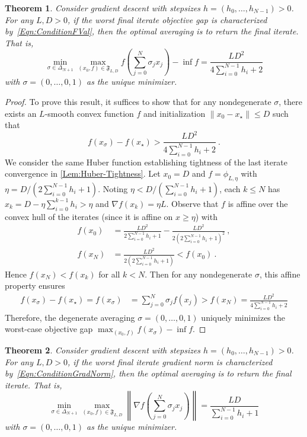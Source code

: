 \documentclass[11pt]{article}
\numberwithin{equation}{section}
\newtheorem{theorem}{Theorem}[section]
\theoremstyle{definition}
\theoremstyle{definition}
\theoremstyle{definition}
\newcommand{\1}{\mathbf{1}}
\newcommand{\xStar}{x_\star}
\newcommand{\xSpecial}{x_\sigma}
\newcommand{\sumH}[1]{\sum_{i=0}^{#1} h_i}
\begin{document}
\begin{theorem}\label{Thm:AvgFunc}
    Consider gradient descent with stepsizes $h=(h_0, \dots, h_{N-1}) > 0$. For any $L,D > 0$, if the worst final iterate objective gap is characterized by~\eqref{Eqn:ConditionFVal}, then the optimal averaging is to return the final iterate. That is,
    \begin{equation} \label{Eqn:minMaxFVal}
        \min_{\sigma\in\Delta_{N+1}} \max_{(x_0,f)\in \mathfrak{F}_{L,D}} f\left(\sum^{N}_{j=0} \sigma_j x_j\right) - \inf f = \frac{LD^2}{4\sumH{N-1}+2}
    \end{equation}
    with $\sigma = (0,\dots,0,1)$ as the unique minimizer.
\end{theorem}
\begin{proof}
    To prove this result, it suffices to show that for any nondegenerate $\sigma$, there exists an $L$-smooth convex function $f$ and initialization $\|x_0-\xStar\|\leq D$ such that
    \begin{equation*}
        f(\xSpecial) - f(\xStar) > \frac{LD^2}{4\sumH{N-1} + 2} \ .
    \end{equation*}
    We consider the same Huber function establishing tightness of the last iterate convergence in \cref{Lem:Huber-Tightness}. Let $x_0=D$ and $f=\phi_{L,\eta}$ with $\eta=D/(2\sum_{i=0}^{N-1}h_i +1)$.
    Noting $\eta < 
    D/(\sum_{i=0}^{N-1}h_i +1)$, each $k\leq N$ has $x_k = D-\eta \sumH{k-1} > \eta$ and $\nabla f(x_k) = \eta L$. Observe that $f$ is affine over the convex hull of the iterates (since it is affine on $x\geq \eta$) with
    \begin{align*}
        f(x_0) &= \frac{LD^2}{2\sum_{i=0}^{N-1} h_i +1} - \frac{LD^2}{2(2\sum_{i=0}^{N-1} h_i +1)^2} \ , \\
        f(x_N) &= \frac{LD^2}{2(2\sum_{i=0}^{N-1} h_i +1)} < f(x_0) \ .
    \end{align*}
    Hence $f(x_N) < f(x_k)$ for all $k<N$. Then for any nondegenerate $\sigma$, this affine property ensures
    \begin{align*}
        f(\xSpecial) - f(\xStar) = f(\xSpecial) & = \sum_{j=0}^N \sigma_j f(x_j)
         > f(x_N) 
         = \frac{LD^2}{4\sumH{N-1}+2}
    \end{align*}
    Therefore, the degenerate averaging $\sigma = (0,\dots,0,1)$ uniquely minimizes the worst-case objective gap $\max_{(x_0,f)} f(\xSpecial) - \inf f$.
\end{proof}

\begin{theorem}\label{Thm:AvgGradNorm}
    Consider gradient descent with stepsizes $h=(h_0, \dots, h_{N-1}) > 0$. For any $L,D > 0$, if the worst final iterate gradient norm is characterized by~\eqref{Eqn:ConditionGradNorm}, then the optimal averaging is to return the final iterate. That is,
    \begin{equation}\label{Eqn:minMaxGradNorm}
        \min_{\sigma\in\Delta_{N+1}} \max_{(x_0,f)\in \mathfrak{F}_{L,D}} \left\|\nabla f\left(\sum^{N}_{j=0} \sigma_j x_j\right) \right\| = \frac{LD}{\sumH{N-1}+1}
    \end{equation}
    with $\sigma = (0,\dots,0,1)$ as the unique minimizer.
\end{theorem}
\end{document}

